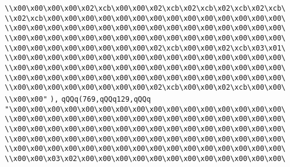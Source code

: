 \verb|\\x00\x00\x00\x00\x02\xcb\x00\x00\x02\xcb\x02\xcb\x02\xcb\x02\xcb\|\newline
\verb|\\x02\xcb\x00\x00\x00\x00\x00\x00\x00\x00\x00\x00\x00\x00\x00\x00\|\newline
\verb|\\x00\x00\x00\x00\x00\x00\x00\x00\x00\x00\x00\x00\x00\x00\x00\x00\|\newline
\verb|\\x00\x00\x00\x00\x00\x00\x00\x00\x00\x00\x00\x00\x00\x00\x00\x00\|\newline
\verb|\\x00\x00\x00\x00\x00\x00\x00\x00\x02\xcb\x00\x00\x02\xcb\x03\x01\|\newline
\verb|\\x00\x00\x00\x00\x00\x00\x00\x00\x00\x00\x00\x00\x00\x00\x00\x00\|\newline
\verb|\\x00\x00\x00\x00\x00\x00\x00\x00\x00\x00\x00\x00\x00\x00\x00\x00\|\newline
\verb|\\x00\x00\x00\x00\x00\x00\x00\x00\x00\x00\x00\x00\x00\x00\x00\x00\|\newline
\verb|\\x00\x00\x00\x00\x00\x00\x00\x00\x02\xcb\x00\x00\x02\xcb\x00\x00\|\newline
\verb|\\x00\x00"|\newline
\verb|),|\newline
\verb|qQQq(769,qQQq129,qQQq|\newline
\verb|"\x00\x00\x00\x00\x00\x00\x00\x00\x00\x00\x00\x00\x00\x00\x00\x00\|\newline
\verb|\\x00\x00\x00\x00\x00\x00\x00\x00\x00\x00\x00\x00\x00\x00\x00\x00\|\newline
\verb|\\x00\x00\x00\x00\x00\x00\x00\x00\x00\x00\x00\x00\x00\x00\x00\x00\|\newline
\verb|\\x00\x00\x00\x00\x00\x00\x00\x00\x00\x00\x00\x00\x00\x00\x00\x00\|\newline
\verb|\\x00\x00\x00\x00\x00\x00\x00\x00\x00\x00\x00\x00\x00\x00\x00\x00\|\newline
\verb|\\x00\x00\x03\x02\x00\x00\x00\x00\x00\x00\x00\x00\x00\x00\x00\x00\|\newline

